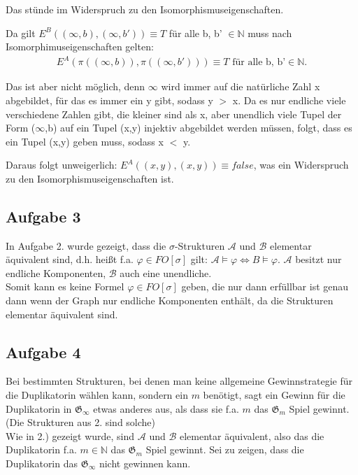 \documentclass[a4paper,10pt]{article}
\newcommand{\N}{\mathbb{N}}
\begin{document}
	Das stünde im Widerspruch zu den Isomorphismuseigenschaften.
	
	Da gilt $E^B((\infty, b),(\infty, b')) \equiv T$ für alle b, b' $\in \mathbb{N}$ muss nach Isomorphimuseigenschaften gelten:
	\begin{align*}
		E^A(\pi((\infty, b)),\pi((\infty, b'))) \equiv T \text{ für alle b, b'} \in \mathbb{N}. 
	\end{align*}
	
	Das ist aber nicht möglich, denn $\infty$ wird immer auf die natürliche Zahl x abgebildet, für das es immer ein y gibt, sodass y $>$ x. 
	Da es nur endliche viele verschiedene Zahlen gibt, die kleiner sind als x, aber unendlich viele Tupel der Form ($\infty$,b) auf ein Tupel 			(x,y) injektiv abgebildet werden müssen, folgt, dass es ein Tupel (x,y) geben muss, sodass x $<$ y.
	
	Daraus folgt unweigerlich:
	$E^A((x,y),(x,y)) \equiv false$, was ein Widerspruch zu den Isomorphismuseigenschaften ist.
	
	
\subsection*{Aufgabe 3}
In Aufgabe 2. wurde gezeigt, dass die $\sigma$-Strukturen $\mathcal{A}$ und $\mathcal{B}$ elementar äquivalent sind, d.h. heißt f.a. $\varphi \in FO[\sigma]$ gilt: $\mathcal{A} \vDash \varphi \Leftrightarrow B \vDash \varphi$. $\mathcal{A}$ besitzt nur endliche Komponenten, $\mathcal{B}$ auch eine unendliche. \\Somit kann es keine Formel $\varphi \in FO[\sigma]$ geben, die nur dann erfüllbar ist genau dann wenn der Graph nur endliche Komponenten enthält, da die Strukturen elementar äquivalent sind.


\subsection*{Aufgabe 4}

Bei bestimmten Strukturen, bei denen man keine allgemeine Gewinnstrategie für die Duplikatorin wählen kann, sondern ein $m$ benötigt, sagt ein Gewinn für die Duplikatorin in $\mathfrak{G}_{\infty}$ etwas anderes aus, als dass sie f.a. $m $ das $\mathfrak{G}_m$ Spiel gewinnt. (Die Strukturen aus 2. sind solche) \\

Wie in 2.) gezeigt wurde, sind $\mathcal{A}$ und $\mathcal{B}$ elementar äquivalent, also das die Duplikatorin f.a. $m \in \N$ das $\mathfrak{G}_m$ Spiel gewinnt.
Sei zu zeigen, dass die Duplikatorin das $\mathfrak{G}_{\infty}$ nicht gewinnen kann. \\
\end{document}
